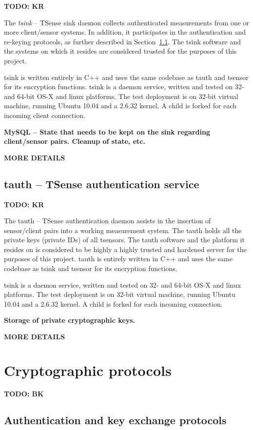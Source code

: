 \textbf{TODO: KR}

The \textit{tsink} -- TSense sink daemon collects authenticated measurements from one or more client/sensor systems. In addition, it participates in the authentication and re-keying protocols, as further described in Section~\ref{}. The tsink software and the systems on which it resides are considered trusted for the purposes of this project.

tsink is written entirely in C++ and uses the same codebase as tauth and tsensor for its encryption functions.
%
tsink is a daemon service, written and tested on 32- and 64-bit OS-X and linux platforms. The test deployment is on 32-bit virtual machine, running Ubuntu 10.04 and a 2.6.32 kernel. A child is forked for each incoming client connection.

\textbf{MySQL -- State that needs to be kept on the sink regarding client/sensor pairs. Cleanup of state, etc.}

\textbf{MORE DETAILS}

\subsection{tauth -- TSense authentication service}

\textbf{TODO: KR}

The tauth -- TSense authentication daemon assists in the insertion of sensor/client pairs into a working measurement system. The tauth holds all the private keys (private IDs) of all tsensors. The tauth software and the platform it resides on is considered to be highly a highly trusted and hardened server for the purposes of this project. tauth is entirely written in C++ and uses the same codebase as tsink and tsensor for its encryption functions.  

tsink is a daemon service, written and tested on 32- and 64-bit OS-X and linux platforms. The test deployment is on 32-bit virtual machine, running Ubuntu 10.04 and a 2.6.32 kernel. A child is forked for each incoming connection.

\textbf{Storage of private cryptographic keys.}

\textbf{MORE DETAILS}

\section{Cryptographic protocols}

\textbf{TODO: BK}

\subsection{Authentication and key exchange protocols}

